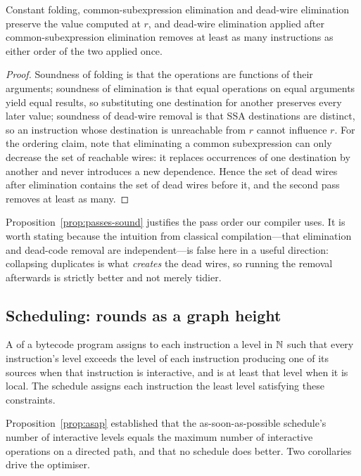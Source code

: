 \begin{proposition}
\label{prop:passes-sound}
Constant folding, common-subexpression elimination and dead-wire elimination
preserve the value computed at $r$, and dead-wire elimination applied after
common-subexpression elimination removes at least as many instructions as either
order of the two applied once.
\end{proposition}

\begin{proof}
Soundness of folding is that the operations are functions of their arguments;
soundness of elimination is that equal operations on equal arguments yield equal
results, so substituting one destination for another preserves every later value;
soundness of dead-wire removal is that SSA destinations are distinct, so an
instruction whose destination is unreachable from $r$ cannot influence $r$. For
the ordering claim, note that eliminating a common subexpression can only decrease
the set of reachable wires: it replaces occurrences of one destination by another
and never introduces a new dependence. Hence the set of dead wires after
elimination contains the set of dead wires before it, and the second pass removes
at least as many.
\end{proof}

Proposition~\ref{prop:passes-sound} justifies the pass order our compiler uses. It
is worth stating because the intuition from classical compilation---that
elimination and dead-code removal are independent---is false here in a useful
direction: collapsing duplicates is what \emph{creates} the dead wires, so running
the removal afterwards is strictly better and not merely tidier.

\subsection{Scheduling: rounds as a graph height}
\label{sec:compiler:sched}

\begin{definition}
\label{def:schedule}
A  of a bytecode program assigns to each instruction a level in $\mathbb{N}$
such that every instruction's level exceeds the level of each instruction
producing one of its sources when that instruction is interactive, and is at least
that level when it is local. The  schedule assigns each
instruction the least level satisfying these constraints.
\end{definition}

Proposition~\ref{prop:asap} established that the as-soon-as-possible schedule's
number of interactive levels equals the maximum number of interactive operations
on a directed path, and that no schedule does better. Two corollaries drive the
optimiser.

